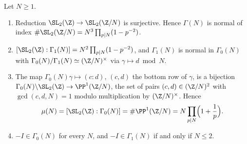 \begin{proposition}[indices]\label{prop:modforms:indices}
Let $N\ge1$.
\begin{enumerate}[label=(\roman*)]
\item Reduction $\SL_2(\Z)\to\SL_2(\Z/N)$ is surjective. Hence $\Gamma(N)$ is normal of index $\#\SL_2(\Z/N)=N^3\prod_{p\mid N}(1-p^{-2})$.
\item $[\SL_2(\Z):\Gamma_1(N)]=N^2\prod_{p\mid N}(1-p^{-2})$, and $\Gamma_1(N)$ is normal in $\Gamma_0(N)$ with $\Gamma_0(N)/\Gamma_1(N)\simeq(\Z/N)^\times$ via $\gamma\mapsto d\bmod N$.
\item The map $\Gamma_0(N)\gamma\mapsto(c:d)$, $(c,d)$ the bottom row of $\gamma$, is a bijection $\Gamma_0(N)\backslash\SL_2(\Z)\to\PP^1(\Z/N)$, the set of pairs $(c,d)\in(\Z/N)^2$ with
$\gcd(c,d,N)=1$ modulo multiplication by $(\Z/N)^\times$. Hence
\[
\mu(N)=[\SL_2(\Z):\Gamma_0(N)]=\#\PP^1(\Z/N)=N\prod_{p\mid N}\Bigl(1+\frac1p\Bigr).
\]
\item $-I\in\Gamma_0(N)$ for every $N$, and $-I\in\Gamma_1(N)$ if and only if $N\le2$.
\end{enumerate}
\end{proposition}

